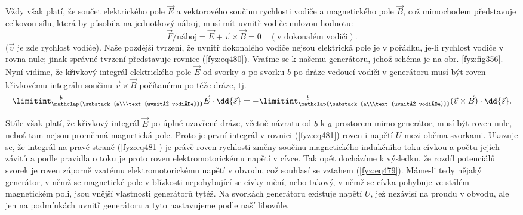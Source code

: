   Vždy však platí, že součet elektrického pole \(\vec{E}\) a vektorového součinu rychlosti vodiče a 
  magnetického pole \(\vec{B}\), což mimochodem představuje celkovou sílu, která by působila na 
  jednotkový náboj, musí mít uvnitř vodiče nulovou hodnotu:
  \begin{equation}\label{fyz:eq480}
   \vec{F}/\text{náboj} = \vec{E} + \vec{v}\times\vec{B} = 0\quad(\text{v dokonalém vodiči}).
  \end{equation}
  (\(\vec{v}\) je zde rychlost vodiče). Naše pozdější tvrzení, že uvnitř dokonalého vodiče nejsou 
  elektrická pole je v pořádku, je-li rychlost vodiče v rovna nule; jinak správné tvrzení 
  představuje rovnice (\ref{fyz:eq480}). Vraťme se k našemu generátoru, jehož schéma je na obr. 
  \ref{fyz:fig356}. Nyní vidíme, že křivkový integrál elektrického pole \(\vec{E}\) od svorky \(a\) 
  po svorku \(b\) po dráze vedoucí vodiči v generátoru musí být roven křivkovému integrálu součinu 
  \(\vec{v}\times\vec{B}\) počítanému po téže dráze, tj.
  \begin{equation}\label{fyz:eq481}
       \limitint_{\mathclap{\substack{a\\\text{uvnitř vodiče}}}}^{\quad b}\vec{E}\cdot\dd{\vec{s}} =
     - \limitint_{\mathclap{\substack{a\\\text{uvnitř vodiče}}}}^{\quad b} 
                                   (\vec{v}\times\vec{B})\cdot\dd{\vec{s}}.
  \end{equation}

  Stále však platí, že křivkový integrál \(\vec{E}\) po úplně uzavřené dráze, včetně návratu od 
  \(b\) k \(a\) prostorem mimo generátor, musí být roven nule, neboť tam nejsou proměnná magnetická 
  pole. Proto je první integrál v rovnici (\ref{fyz:eq481}) roven i napětí \(U\) mezi oběma 
  svorkami. Ukazuje se, že integrál na pravé straně (\ref{fyz:eq481}) je právě roven rychlosti 
  změny součinu magnetického indukčního toku cívkou a počtu jejích závitů a podle pravidla o toku 
  je proto roven elektromotorickému napětí v cívce. Tak opět docházíme k výsledku, že rozdíl 
  potenciálů svorek je roven záporně vzatému elektromotorickému napětí v obvodu, což souhlasí se 
  vztahem (\ref{fyz:eq479}). Máme-li tedy nějaký generátor, v němž se magnetické pole v blízkosti 
  nepohybující se cívky mění, nebo takový, v němž se cívka pohybuje ve stálém magnetickém poli, 
  jsou vnější vlastnosti generátorů tytéž. Na svorkách generátoru existuje napětí \(U\), jež 
  nezávisí na proudu v obvodu, ale jen na podmínkách uvnitř generátoru a tyto nastavujeme podle 
  naší libovůle. 
  
